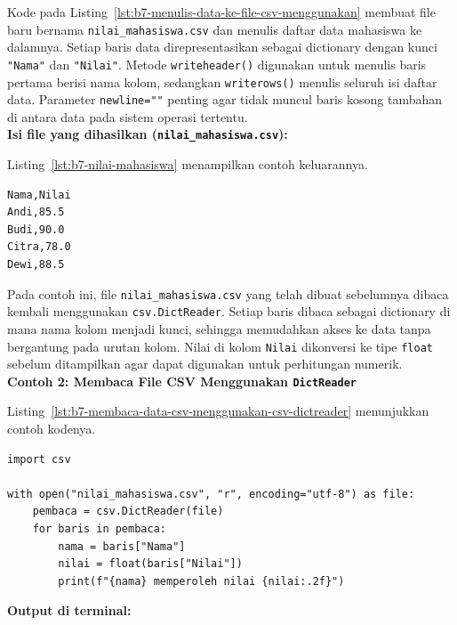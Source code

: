 Kode pada Listing~\ref{lst:b7-menulis-data-ke-file-csv-menggunakan} membuat file baru bernama \texttt{nilai\_mahasiswa.csv} dan menulis daftar data mahasiswa ke dalamnya.  
Setiap baris data direpresentasikan sebagai dictionary dengan kunci \texttt{"Nama"} dan \texttt{"Nilai"}.  
Metode \texttt{writeheader()} digunakan untuk menulis baris pertama berisi nama kolom, sedangkan \texttt{writerows()} menulis seluruh isi daftar data.  
Parameter \texttt{newline=""} penting agar tidak muncul baris kosong tambahan di antara data pada sistem operasi tertentu.\\

\noindent\textbf{Isi file yang dihasilkan (\texttt{nilai\_mahasiswa.csv}):}

Listing~\ref{lst:b7-nilai-mahasiswa} menampilkan contoh keluarannya.

\begin{lstlisting}[language=bash, caption={Hasil isi file nilai_mahasiswa.csv}, label={lst:b7-nilai-mahasiswa}]
Nama,Nilai
Andi,85.5
Budi,90.0
Citra,78.0
Dewi,88.5
\end{lstlisting}

Pada contoh ini, file \texttt{nilai\_mahasiswa.csv} yang telah dibuat sebelumnya dibaca kembali menggunakan \texttt{csv.DictReader}.  
Setiap baris dibaca sebagai dictionary di mana nama kolom menjadi kunci, sehingga memudahkan akses ke data tanpa bergantung pada urutan kolom.  
Nilai di kolom \texttt{Nilai} dikonversi ke tipe \texttt{float} sebelum ditampilkan agar dapat digunakan untuk perhitungan numerik.\\

\noindent\textbf{Contoh 2: Membaca File CSV Menggunakan \texttt{DictReader}}

Listing~\ref{lst:b7-membaca-data-csv-menggunakan-csv-dictreader} menunjukkan contoh kodenya.

\begin{lstlisting}[style=PythonStyle, caption={Membaca data CSV menggunakan csv.DictReader}, label={lst:b7-membaca-data-csv-menggunakan-csv-dictreader}]
import csv

with open("nilai_mahasiswa.csv", "r", encoding="utf-8") as file:
    pembaca = csv.DictReader(file)
    for baris in pembaca:
        nama = baris["Nama"]
        nilai = float(baris["Nilai"])
        print(f"{nama} memperoleh nilai {nilai:.2f}")
\end{lstlisting}



\noindent\textbf{Output di terminal:}

